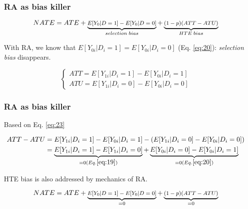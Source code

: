 \documentclass[12pt,english,dvipsnames,aspectratio=169,handout]{beamer}\usepackage[]{graphicx}\usepackage[]{xcolor}
\begin{document}
\begin{frame}
  \frametitle{RA as bias killer}
  
  \begin{equation}
  \footnotesize
  NATE = ATE + \underbrace{E[Y_0|D=1] - E[Y_0|D=0]}_{selection\;bias} + \underbrace{(1-p)(ATT-ATU)}_{HTE\;bias}
  \end{equation}
  
  With RA, we know that $E[Y_{0i}|D_i=1] = E[Y_{0i}|D_i=0]$ (Eq. \ref{eq:20}): \textit{selection bias} disappears.
  
  \pause
  
  \begin{equation}
    \begin{cases}
    ATT = E[Y_{1i}|D_i=1] - E[Y_{0i}|D_i=1] \\
    ATU = E[Y_{1i}|D_i=0] - E[Y_{0i}|D_i=0] 
    \end{cases}
    \label{eq:23}
  \end{equation}
  
\end{frame}


\begin{frame}
  \frametitle{RA as bias killer}
  
  Based on Eq. \ref{eq:23}
  
  \begin{scriptsize}
    \begin{align}
    ATT - ATU &= E[Y_{1i}|D_i=1] - E[Y_{0i}|D_i=1] - (E[Y_{1i}|D_i=0] - E[Y_{0i}|D_i=0]) \nonumber \\
              &= \underbrace{E[Y_{1i}|D_i=1] - E[Y_{1i}|D_i=0]}_{=0 (Eq. \ref{eq:19})} + \underbrace{E[Y_{0i}|D_i=0] - E[Y_{0i}|D_i=1]}_{=0 (Eq. \ref{eq:20})}
    \label{eq:24}
    \end{align}
\end{scriptsize}

HTE bias is also addressed by mechanics of RA.\bigskip
\pause

\begin{equation}
  \footnotesize
  NATE = ATE + \underbrace{E[Y_0|D=1] - E[Y_0|D=0]}_{=0} + \underbrace{(1-p)(ATT-ATU)}_{=0}
  \end{equation}
  
\end{frame}
\end{document}
